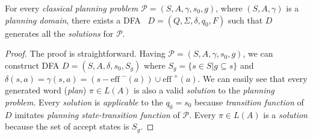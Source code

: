 \begin{thm}\label{thm02:1}
    For every \emph{classical planning problem $\mathcal{P} = (S, A, \gamma, s_0, g)$}, where $(S, A, \gamma)$ is a \emph{planning domain}, there exists a DFA~\cite{chytil} $D = (Q, \Sigma, \delta, q_0, F)$ such that $D$ generates all the \emph{solutions} for $\mathcal{P}$.
\end{thm}
\begin{proof}
    The proof is straightforward. Having $\mathcal{P} = (S, A, \gamma, s_0, g)$, we can construct DFA $D = (S,A,\delta,s_0,S_g)$ where $S_g=\{s \in S | g \subseteq s\}$ and $\delta(s,a) = \gamma(s, a) = (s-\text{eff}^{\,\,-}(a)) \cup \text{eff}^{\,\,+}(a)$. We can easily see that every generated word (\emph{plan}) $\pi \in L(A)$ is also a valid \emph{solution} to the \emph{planning problem}. Every \emph{solution} is \emph{applicable} to the $q_0 = s_0$ because \emph{transition function} of $D$ imitates \emph{planning state-transition function} of $\mathcal{P}$. Every $\pi \in L(A)$ is a \emph{solution} because the set of accept states is $S_g$.
\end{proof}

